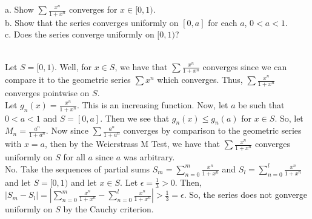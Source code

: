 a. Show $\sum\frac{x^n}{1+x^n}$ converges for $x\in[0,1)$.\\

b. Show that the series converges uniformly on $[0,a]$ for each $a$, $0<a<1$.\\

c. Does the series converge uniformly on $[0,1)$?\\

\begin{solution}\renewcommand{\qedsymbol}{}\ \\
    Let $S=[0,1)$. Well, for $x\in S$, we have that $\sum\frac{x^n}{1+x^n}$ converges since we can
    compare it to the geometric series $\sum x^n$ which converges. Thus, $\sum\frac{x^n}{1+x^n}$
    converges pointwise on $S$.\\

    Let $g_n(x)=\frac{x^n}{1+x^n}$. This is an increasing function. Now, let $a$ be such that $0<a<1$
    and $S=[0,a]$. Then we see that $g_n(x)\leq g_n(a)$ for $x\in S$. So, let $M_n=\frac{a^n}{1+a^n}$.
    Now since $\sum\frac{a^n}{1+a^n}$ converges by comparison to the geometric series with $x=a$, then
    by the Weierstrass M Test, we have that $\sum\frac{x^n}{1+x^n}$ converges uniformly on $S$ for all
    $a$ since $a$ was arbitrary.\\

    No. Take the sequences of partial sums $S_m=\sum_{n=0}^m\frac{x^n}{1+x^n}$ and
    $S_l=\sum_{n=0}^l\frac{x^n}{1+x^n}$ and let $S=[0,1)$ and let $x\in S$. Let $\epsilon=\frac13>0$.
    Then, $|S_m-S_l|=|\sum_{n=0}^m\frac{x^n}{1+x^n}-\sum_{n=0}^l\frac{x^n}{1+x^n}|>\frac13=\epsilon$.
    So, the series does not gonverge uniformly on $S$ by the Cauchy criterion.

\end{solution}